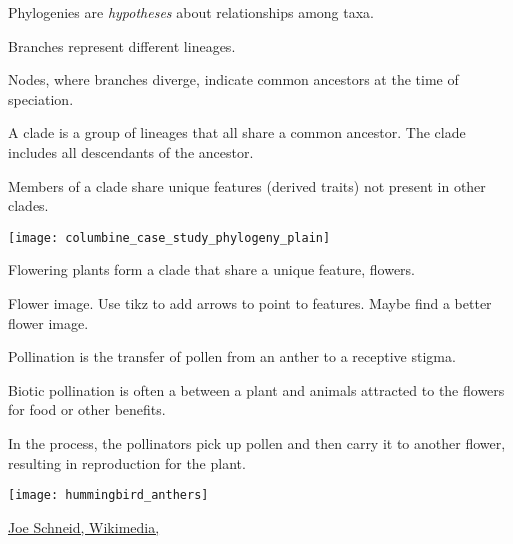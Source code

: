 \documentclass[t,hidelinks]{beamer}
\begin{document}
%
\begin{frame}[t]{Phylogenies are \emph{hypotheses} about relationships among taxa.}
	
	\begin{multicols}{2}
		\hangpara Branches represent different lineages.\vspace*{-1ex}

		\hangpara Nodes, where branches diverge, indicate common ancestors at the time of speciation.\vspace*{-1ex}

		\hangpara A clade is a group of lineages that all share a common ancestor. The clade includes all descendants of the ancestor.\vspace*{-1ex}
			
		\hangpara Members of a clade share unique features (derived traits) not present in other clades.\vspace*{-1ex} %

	\columnbreak
		
		\hfill \texttt{[image: columbine\_case\_study\_phylogeny\_plain]}
		
	\end{multicols}
\end{frame}
%
\begin{frame}[t]{Flowering plants form a clade that share a unique feature, flowers.}
	
	\hangpara Flower image. Use tikz to add arrows to point to features. Maybe find a better flower image.
	
\end{frame}
%
\begin{frame}[t]{Pollination is the transfer of pollen from an anther to a receptive stigma.}

	\begin{multicols}{2}
	\hangpara Biotic pollination is often a  between a plant and animals attracted to the flowers for food or other benefits. 
	
	\hangpara In the process, the pollinators pick up pollen and then carry it to another flower, resulting in reproduction for the plant. 

	\columnbreak
	
	\texttt{[image: hummingbird\_anthers]}
	\end{multicols}
	
	\vfilll
	
	\hfill \tiny \href{https://commons.wikimedia.org/wiki/File:RubyThroatedHummingbird.jpg}{Joe Schneid, Wikimedia, } %
	
\end{frame}
\end{document}
